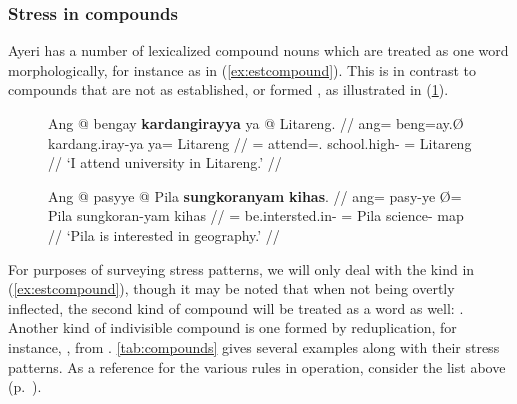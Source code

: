 \subsubsection{Stress in compounds}

Ayeri has a number of lexicalized compound nouns which are treated
as one word morphologically, for instance as in (\ref{ex:estcompound}). This is
in contrast to compounds that are not as established, or formed , as illustrated in (\ref{ex:adhoccompound}).

\begin{figure}[h]
\pex
\a\label{ex:estcompound}\begingl
	\gla Ang @ bengay \textbf{kardangirayya} ya @ Litareng. //
	\glb ang= beng=ay.Ø kardang.iray-ya ya= Litareng //
	\glc \AgtT{}= attend=\Fsg{}.\Top{} school.high-\Loc{} \Loc{}= Litareng //
	\glft `I attend university in Litareng.' //
\endgl

\a\label{ex:adhoccompound}\begingl
	\gla Ang @ pasyye {} @ Pila \textbf{sungkoranyam} \textbf{kihas}. //
	\glb ang= pasy-ye Ø= Pila sungkoran-yam kihas //
	\glc \AgtT{}= be.intersted.in-\TsgF{} \Top{}= Pila science-\Dat{} map //
	\glft `Pila is interested in geography.' //
\endgl
\xe
\end{figure}

For purposes of surveying stress patterns, we will only deal with the kind in 
(\ref{ex:estcompound}), though it may be noted that when not being overtly 
inflected, the second kind of compound will be treated as a word as well:
. Another kind of indivisible 
compound is one formed by reduplication, for instance,
, from .
\autoref{tab:compounds} gives several examples along with their stress
patterns. As a reference for the various rules in operation, consider the list
above (p.~\pageref{2sylsumm}).

